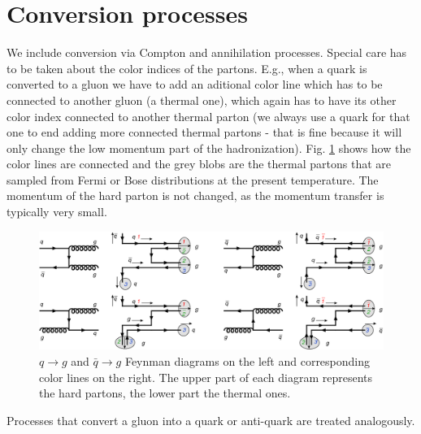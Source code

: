 \section{Conversion processes}
\label{conversion}
We include conversion via Compton and annihilation processes. Special care has to be taken 
about the color indices of the partons. E.g., when a quark is converted to a gluon we have
to add an aditional color line which has to be connected to another gluon (a thermal one),
which again has to have its other color index connected to another thermal parton (we always
use a quark for that one to end adding more connected thermal partons - that is fine because
it will only change the low momentum part of the hadronization).
Fig. \ref{fig:quarkConv} shows how the color lines are connected and the grey blobs are 
the thermal partons that are sampled from Fermi or Bose distributions at the present 
temperature. The momentum of the hard parton is not changed, as the momentum transfer 
is typically very small.
\begin{figure}[htb]
  \begin{center}
    \includegraphics[width=16cm]{quarkConversion1}
    \caption{$q\rightarrow g$ and $\bar{q}\rightarrow g$ Feynman diagrams on the left and corresponding color lines
    on the right. The upper part of each diagram represents the hard partons, the lower part 
the thermal ones.
      \label{fig:quarkConv}}
  \end{center}
\end{figure}

Processes that convert a gluon into a quark or anti-quark are treated analogously.




